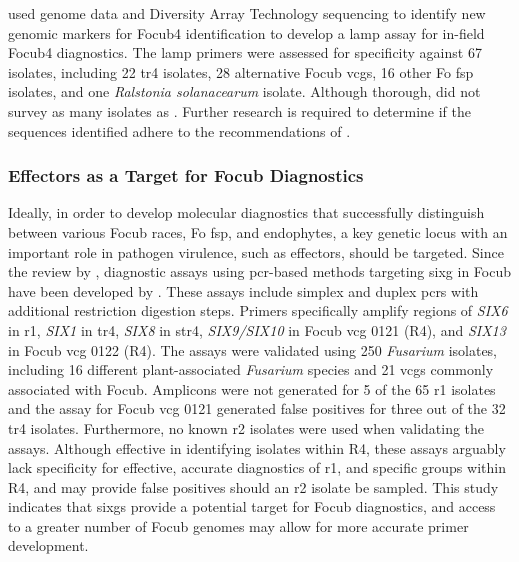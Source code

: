 \textcite{Ordonez2019} used genome data and Diversity Array Technology sequencing to identify new genomic markers for \ac{Focub4} identification to develop a \ac{lamp} assay for in-field \ac{Focub4} diagnostics. The \ac{lamp} primers were assessed for specificity against 67 isolates, including 22 \ac{tr4} isolates, 28 alternative \ac{Focub} \acp{vcg}, 16 other \ac{Fo} \ac{fsp} isolates, and one \textit{Ralstonia solanacearum} isolate. Although thorough, \textcite{Ordonez2019}  did not survey as many isolates as \textcite{Magdama2019}. Further research is required to determine if the sequences identified adhere to the recommendations of \textcite{Magdama2019}. 

\subsubsection{Effectors as a Target for \acl{Focub} Diagnostics}

Ideally, in order to develop molecular diagnostics that successfully distinguish between various \ac{Focub} races, \ac{Fo} \ac{fsp}, and endophytes, a key genetic locus with an important role in pathogen virulence, such as effectors, should be targeted. Since the review by \textcite{Magdama2019}, diagnostic assays using \ac{pcr}-based methods targeting \ac{sixg} in \ac{Focub} have been developed by \textcite{Carvalhais2019}. These assays include simplex and duplex \acp{pcr} with additional restriction digestion steps. Primers specifically amplify regions of \textit{SIX6} in \ac{r1}, \textit{SIX1} in \ac{tr4}, \textit{SIX8} in \ac{str4}, \textit{SIX9/SIX10} in \ac{Focub} \ac{vcg} 0121 (R4), and \textit{SIX13} in \ac{Focub} \ac{vcg} 0122 (R4). The assays were validated using 250 \textit{Fusarium} isolates, including 16 different plant-associated \textit{Fusarium} species and 21 \acp{vcg}  commonly associated with \ac{Focub}. Amplicons were not generated for 5 of the 65 \ac{r1} isolates and the assay for \ac{Focub} \ac{vcg} 0121 generated false positives for three out of the 32 \ac{tr4} isolates. Furthermore, no known \ac{r2} isolates were used when validating the assays. Although effective in identifying isolates within R4, these assays arguably lack specificity for effective, accurate diagnostics of \ac{r1}, and specific groups within R4, and may provide false positives should an \ac{r2} isolate be sampled. This study indicates that \acp{sixg} provide a potential target for \ac{Focub} diagnostics, and access to a greater number of \ac{Focub} genomes may allow for more accurate primer development.  

